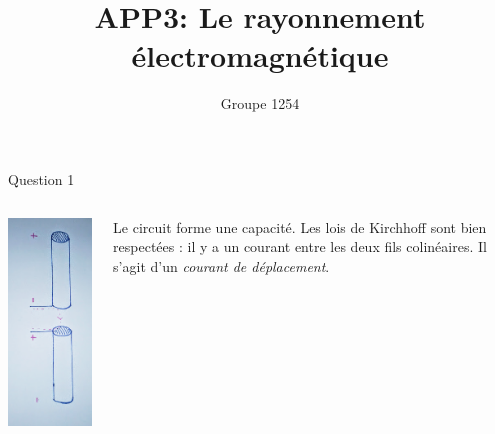 \documentclass{beamer}
\title{APP3: Le rayonnement électromagnétique}
\author{Groupe 1254}
\begin{document}
\begin{frame}
	\maketitle
\end{frame}
\begin{frame}{Question 1}
	\begin{columns}
		\begin{column}{0.40\textwidth}
			\begin{center}
	    		\includegraphics[scale=0.3, angle=90]{question1.png}
        		\end{center}
		\end{column}
		\begin{column}{0.40\textwidth}
		Le circuit forme une capacité.
		Les lois de Kirchhoff sont bien respectées : il y a un courant entre les deux fils colinéaires. Il s'agit 			d'un \emph{courant de déplacement}.
		\end{column}
	\end{columns}
\end{frame}
\end{document}
